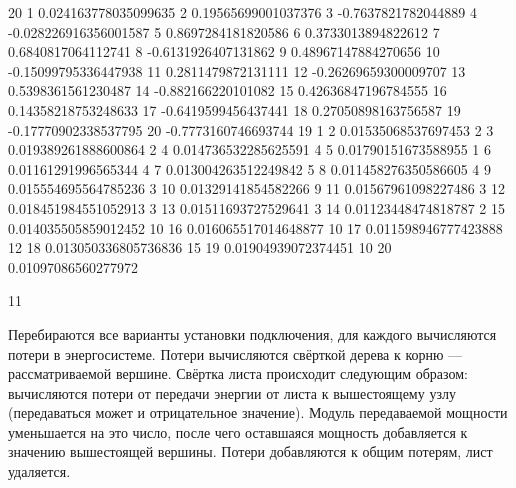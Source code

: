 \begin{myverbbox}[\small]{\vinput}
    20
    1 0.024163778035099635
    2 0.19565699001037376
    3 -0.7637821782044889
    4 -0.028226916356001587
    5 0.8697284181820586
    6 0.3733013894822612
    7 0.6840817064112741
    8 -0.6131926407131862
    9 0.48967147884270656
    10 -0.15099795336447938
    11 0.2811479872131111
    12 -0.26269659300009707
    13 0.5398361561230487
    14 -0.882166220101082
    15 0.42636847196784555
    16 0.14358218753248633
    17 -0.6419599456437441
    18 0.27050898163756587
    19 -0.17770902338537795
    20 -0.7773160746693744
    19
    1 2 0.01535068537697453
    2 3 0.019389261888600864
    2 4 0.014736532285625591
    4 5 0.01790151673588955
    1 6 0.01161291996565344
    4 7 0.013004263512249842
    5 8 0.011458276350586605
    4 9 0.015554695564785236
    3 10 0.01329141854582266
    9 11 0.01567961098227486
    3 12 0.018451984551052913
    3 13 0.01511693727529641
    3 14 0.01123448474818787
    2 15 0.014035505859012452
    10 16 0.016065517014648877
    10 17 0.011598946777423888
    12 18 0.013050336805736836
    15 19 0.01904939072374451
    10 20 0.01097086560277972
\end{myverbbox}
\begin{myverbbox}[\small]{\voutput}
    11
\end{myverbbox}

\solutionSection

Перебираются все варианты установки подключения, для каждого вычисляются потери в энергосистеме. Потери вычисляются свёрткой дерева к корню — рассматриваемой вершине. Свёртка листа происходит следующим образом: вычисляются потери от передачи энергии от листа к вышестоящему узлу (передаваться может и отрицательное значение). Модуль передаваемой мощности уменьшается на это число, после чего оставшаяся мощность добавляется к значению вышестоящей вершины. Потери добавляются к общим потерям, лист удаляется.

